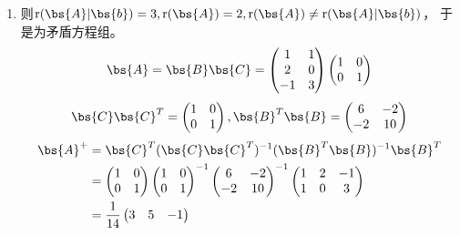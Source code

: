 \documentclass[12pt, a4paper, oneside, UTF8]{ctexbook}
\begin{document}
\begin{solution}
\begin{enumerate}[label=(\arabic*)]
        \item  则$\mathrm{r}(\bs{A}|\bs{b})=3,\mathrm{r}(\bs{A})=2,\mathrm{r}(\bs{A}) \neq \mathrm{r}(\bs{A}|\bs{b})$，
        于是为矛盾方程组。
        \begin{align*}
            \bs{A}=\bs{B}\bs{C}=\begin{pmatrix}
                1&1\\
                2&0\\
                -1&3
            \end{pmatrix}\begin{pmatrix}
                1&0\\
                0&1
            \end{pmatrix}
        \end{align*}
        \begin{align*}
            \bs{C}\bs{C}^T=\begin{pmatrix}
                1&0\\
                0&1
            \end{pmatrix},\bs{B}^T\bs{B}=\begin{pmatrix}
                6&-2\\
                -2&10
            \end{pmatrix}
        \end{align*}
        \begin{align*}
            \bs{A}^+&=\bs{C}^T(\bs{C}\bs{C}^T)^{-1}(\bs{B}^T\bs{B})^{-1}\bs{B}^T\\
            &=\begin{pmatrix}
                1&0\\
                0&1
            \end{pmatrix}\begin{pmatrix}
                1&0\\
                0&1
            \end{pmatrix}^{-1}\begin{pmatrix}
                6&-2\\
                -2&10
            \end{pmatrix}^{-1}\begin{pmatrix}
                1&2&-1\\
                1&0&3
            \end{pmatrix}\\
            &=\frac{1}{14}\begin{pmatrix}
                3&5&-1\\

\end{pmatrix}
\end{align*}
\end{enumerate}
\end{solution}
\end{document}

